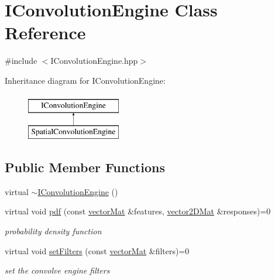 \hypertarget{classIConvolutionEngine}{\section{\-I\-Convolution\-Engine \-Class \-Reference}
\label{classIConvolutionEngine}
}


{\ttfamily \#include $<$\-I\-Convolution\-Engine.\-hpp$>$}

\-Inheritance diagram for \-I\-Convolution\-Engine\-:\begin{figure}[H]
\begin{center}
\leavevmode
\includegraphics[height=2.000000cm]{classIConvolutionEngine}
\end{center}
\end{figure}
\subsection*{\-Public \-Member \-Functions}
\begin{DoxyCompactItemize}
\item 
virtual \hyperlink{classIConvolutionEngine_a554cb87e8dbd32552defd43549b9c1b3}{$\sim$\-I\-Convolution\-Engine} ()
\item 
virtual void \hyperlink{classIConvolutionEngine_ab5aaabb634629a714d397a6c1a9c9400}{pdf} (const \hyperlink{types_8hpp_a3207a7addcfa415d1c83622febcb1e9b}{vector\-Mat} \&features, \hyperlink{types_8hpp_a33cacb85be7b8df3dc0b67d5d849f4cc}{vector2\-D\-Mat} \&responses)=0
\begin{DoxyCompactList}\small\item\em probability density function \end{DoxyCompactList}\item 
virtual void \hyperlink{classIConvolutionEngine_a3570aae351b5fcb93bcd87a06c65ea0a}{set\-Filters} (const \hyperlink{types_8hpp_a3207a7addcfa415d1c83622febcb1e9b}{vector\-Mat} \&filters)=0
\begin{DoxyCompactList}\small\item\em set the convolve engine filters \end{DoxyCompactList}\end{DoxyCompactItemize}


